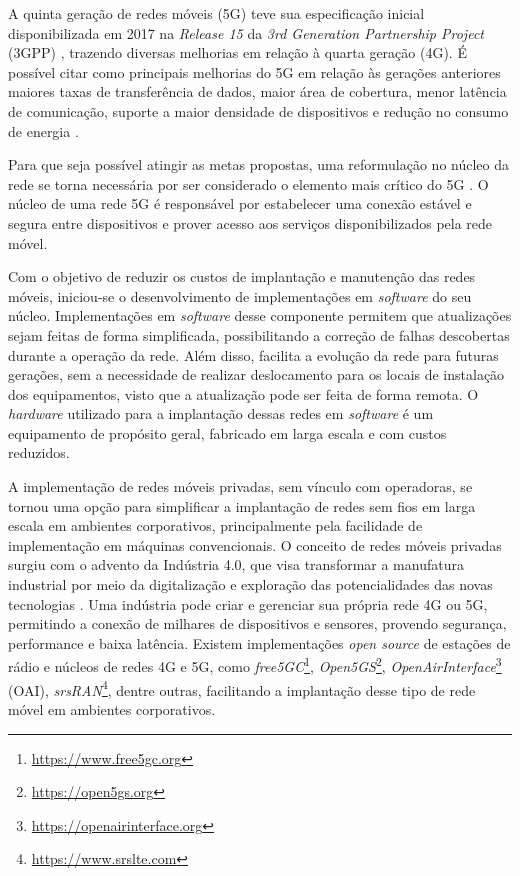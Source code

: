 A quinta geração de redes móveis (5G) teve sua especificação inicial disponibilizada em 2017 na \textit{Release 15} da \textit{3rd Generation Partnership Project} (3GPP) \cite{Redana2020}, trazendo diversas melhorias em relação à quarta geração (4G).
É possível citar como principais melhorias do 5G em relação às gerações anteriores maiores taxas de transferência de dados, maior área de cobertura, menor latência de comunicação, suporte a maior densidade de dispositivos e redução no consumo de energia \cite{Ahmad2019}.

Para que seja possível atingir as metas propostas, uma reformulação no núcleo da rede se torna necessária por ser considerado o elemento mais crítico do 5G \cite{Cardoso2020}.
O núcleo de uma rede 5G é responsável por estabelecer uma conexão estável e segura entre dispositivos e prover acesso aos serviços disponibilizados pela rede móvel.

Com o objetivo de reduzir os custos de implantação e manutenção das redes móveis, iniciou-se o desenvolvimento de implementações em \textit{software} do seu núcleo.
Implementações em \textit{software} desse componente permitem que atualizações sejam feitas de forma simplificada, possibilitando a correção de falhas descobertas durante a operação da rede. Além disso, facilita a evolução da rede para futuras gerações, sem a necessidade de realizar deslocamento para os locais de instalação dos equipamentos, visto que a atualização pode ser feita de forma remota.
O \textit{hardware} utilizado para a implantação dessas redes em \textit{software} é um equipamento de propósito geral, fabricado em larga escala e com custos reduzidos.

A implementação de redes móveis privadas, sem vínculo com operadoras, se tornou uma opção para simplificar a implantação de redes sem fios em larga escala em ambientes corporativos, principalmente pela facilidade de implementação em máquinas convencionais.
O conceito de redes móveis privadas surgiu com o advento da Indústria 4.0, que visa transformar a manufatura industrial por meio da digitalização e exploração das potencialidades das novas tecnologias \cite{Rojko2017}.
Uma indústria pode criar e gerenciar sua própria rede 4G ou 5G, permitindo a conexão de milhares de dispositivos e sensores, provendo segurança, performance e baixa latência.
Existem implementações \textit{open source} de estações de rádio e núcleos de redes 4G e 5G, como \textit{free5GC}\footnote{\url{https://www.free5gc.org}}, \textit{Open5GS}\footnote{\url{https://open5gs.org}}, \textit{OpenAirInterface}\footnote{\url{https://openairinterface.org}} (OAI), \textit{srsRAN}\footnote{\url{https://www.srslte.com}}, dentre outras, facilitando a implantação desse tipo de rede móvel em ambientes corporativos.

